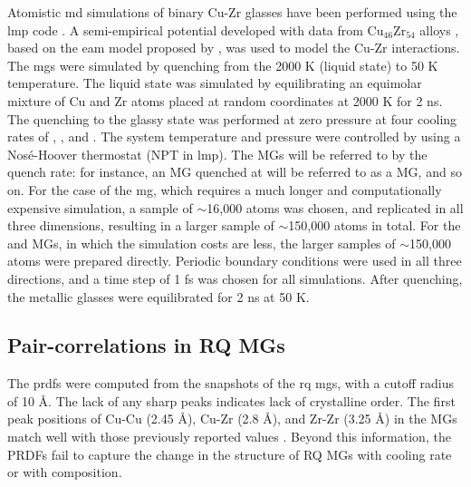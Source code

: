 \begin{changebar}
Atomistic \gls{md} simulations of binary Cu-Zr glasses have been performed using the \gls{lmp} code \cite{Plimpton1995,Thompson2022}. A semi-empirical potential developed with data from Cu$ _{46}$Zr$ _{54} $ alloys \cite{Mendelev2019}, based on the \gls{eam} model proposed by \textcite{Daw1993}, was used to model the Cu-Zr interactions. The \cz  \gls{mg}s were simulated by quenching from the 2000 K (liquid state) to 50 K temperature. The liquid state was simulated by equilibrating an equimolar mixture of Cu and Zr atoms placed at random coordinates at 2000 K for 2 ns. The quenching to the glassy state was performed at zero pressure at four cooling rates of , ,  and . The system temperature and pressure were controlled by using a Nos\'e-Hoover thermostat (NPT in \gls{lmp}). The MGs will be referred to by the quench rate: for instance, an MG quenched at  will be referred to as a  MG, and so on. For the case of the  \gls{mg}, which requires a much longer and computationally expensive simulation, a sample of $\sim$16,000 atoms was chosen, and replicated in all three dimensions, resulting in a larger sample of $\sim$150,000 atoms in total. For the  and  MGs, in which the simulation costs are less, the larger samples of $\sim$150,000 atoms were prepared directly. Periodic boundary conditions were used in all three directions, and a time step of 1 \gls{fs} was chosen for all simulations. After quenching, the metallic glasses were equilibrated for 2 ns at 50 K. \par
\end{changebar}

\subsection{Pair-correlations in RQ MGs} \label{s:rdf-mgs}
The \glspl{prdf} were computed from the snapshots of the \gls{rq} \gls{mg}s, with a cutoff radius of 10 \r{A}. The lack of any sharp peaks indicates lack of crystalline order. The first peak positions of Cu-Cu (2.45 \r{A}), Cu-Zr (2.8 \r{A}), and Zr-Zr (3.25 \r{A}) in the MGs match well with those previously reported values \cite{Duan2005,Nasu2007}. Beyond this information, the PRDFs fail to capture the change in the structure of RQ MGs with cooling rate or with composition. \par

%
